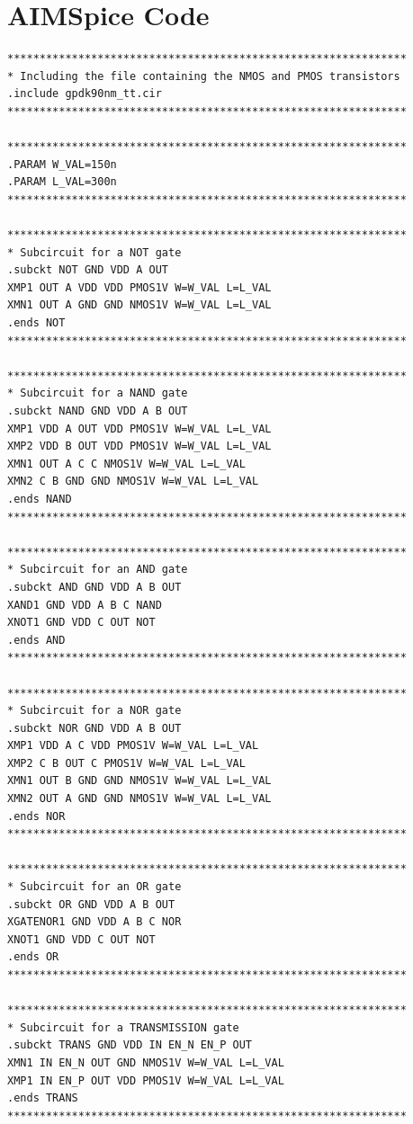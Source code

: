 \appendix
\section{AIMSpice Code}
\label{appendix:aimspice}

\begin{lstlisting}[style=aimspiceStyle, caption=1-bit register in AIMSPICE, label=testcode]
**************************************************************
* Including the file containing the NMOS and PMOS transistors
.include gpdk90nm_tt.cir
**************************************************************

**************************************************************
.PARAM W_VAL=150n
.PARAM L_VAL=300n
**************************************************************

**************************************************************
* Subcircuit for a NOT gate 
.subckt NOT GND VDD A OUT
XMP1 OUT A VDD VDD PMOS1V W=W_VAL L=L_VAL 
XMN1 OUT A GND GND NMOS1V W=W_VAL L=L_VAL
.ends NOT
**************************************************************

**************************************************************
* Subcircuit for a NAND gate 
.subckt NAND GND VDD A B OUT
XMP1 VDD A OUT VDD PMOS1V W=W_VAL L=L_VAL 
XMP2 VDD B OUT VDD PMOS1V W=W_VAL L=L_VAL 
XMN1 OUT A C C NMOS1V W=W_VAL L=L_VAL 
XMN2 C B GND GND NMOS1V W=W_VAL L=L_VAL 
.ends NAND
**************************************************************

**************************************************************
* Subcircuit for an AND gate 
.subckt AND GND VDD A B OUT
XAND1 GND VDD A B C NAND
XNOT1 GND VDD C OUT NOT
.ends AND
**************************************************************

**************************************************************
* Subcircuit for a NOR gate 
.subckt NOR GND VDD A B OUT
XMP1 VDD A C VDD PMOS1V W=W_VAL L=L_VAL 
XMP2 C B OUT C PMOS1V W=W_VAL L=L_VAL 
XMN1 OUT B GND GND NMOS1V W=W_VAL L=L_VAL 
XMN2 OUT A GND GND NMOS1V W=W_VAL L=L_VAL 
.ends NOR
**************************************************************

**************************************************************
* Subcircuit for an OR gate 
.subckt OR GND VDD A B OUT
XGATENOR1 GND VDD A B C NOR
XNOT1 GND VDD C OUT NOT
.ends OR
**************************************************************

**************************************************************
* Subcircuit for a TRANSMISSION gate 
.subckt TRANS GND VDD IN EN_N EN_P OUT
XMN1 IN EN_N OUT GND NMOS1V W=W_VAL L=L_VAL
XMP1 IN EN_P OUT VDD PMOS1V W=W_VAL L=L_VAL 
.ends TRANS
**************************************************************


\end{lstlisting}

